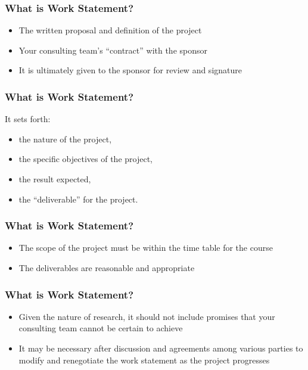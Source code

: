\documentclass[hyperref={colorlinks=false},compress,handout,10pt]{beamer}
\let\olditem\item
\renewcommand{\item}{\setlength{\itemsep}{0.5\baselineskip}\olditem}
\begin{document}
\begin{frame}
    \frametitle{What is Work Statement?}
    \begin{itemize}
        \item The written proposal and definition of the project
            \vspace{1cm}
        \item Your consulting team's ``contract'' with the sponsor
            \vspace{1cm}
        \item It is ultimately given to the sponsor for review and signature
    \end{itemize}
\end{frame}



\begin{frame}
    \frametitle{What is Work Statement?}
It sets forth: 
    \begin{itemize}
        \item the nature of the project,
        \item the specific objectives of the project, 
        \item the result expected, 
        \item the ``deliverable'' for the project.
    \end{itemize}
\end{frame}

\begin{frame}
    \frametitle{What is Work Statement?}
    \begin{itemize}
        \item The scope of the project must be within the time table for the
            course
            \vspace{1cm}
        \item The deliverables are reasonable and appropriate
    \end{itemize}
\end{frame}

\begin{frame}
    \frametitle{What is Work Statement?}
    \begin{itemize}
        \item Given the nature of research, it should not include promises
            that your consulting team cannot be certain to achieve
            \vspace{1cm}
        \item It may be necessary after discussion and agreements among
            various parties to modify and renegotiate the work statement as 
            the project progresses
    \end{itemize}
\end{frame}
\end{document}
